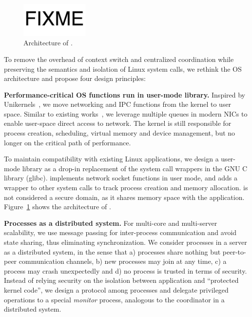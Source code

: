 \begin{figure}[t]
	\centering
	\includegraphics[width=0.3\textwidth]{images/fixme}
	\caption{Architecture of \sys{}.}
	\label{fig:architecture}
\end{figure}


To remove the overhead of context switch and centralized coordination while preserving the semantics and isolation of Linux system calls, we rethink the OS architecture and propose four design principles:

\textbf{Performance-critical OS functions run in user-mode library.}
Inspired by Unikernels~\cite{madhavapeddy2013unikernels}, we move networking and IPC functions from the kernel to user space. Similar to existing works~\cite{peter2016arrakis,jeong2014mtcp,libvma}, we leverage multiple queues in modern NICs to enable user-space direct access to network. The kernel is still responsible for process creation, scheduling, virtual memory and device management, but no longer on the critical path of performance.

To maintain compatibility with existing Linux applications, we design a user-mode library \libipc as a drop-in replacement of the system call wrappers in the GNU C library (glibc). \libipc{} implements network socket functions in user mode, and adds a wrapper to other system calls to track process creation and memory allocation. \libipc{} is not considered a secure domain, as it shares memory space with the application. Figure~\ref{fig:architecture} shows the architecture of \sys{}.

\textbf{Processes as a distributed system.}
For multi-core and multi-server scalability, we use message passing for inter-process communication and avoid state sharing, thus eliminating synchronization. We consider processes in a server as a distributed system, in the sense that a) processes share nothing but peer-to-peer communication channels, b) new processes may join at any time, c) a process may crash unexpectedly and d) no process is trusted in terms of security. Instead of relying security on the isolation between application and ``protected kernel code'', we design a protocol among processes and delegate privileged operations to a special \textit{monitor} process, analogous to the coordinator in a distributed system.

